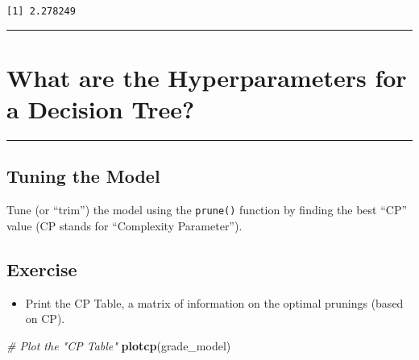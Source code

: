 \documentclass[
]{book}
\newenvironment{Shaded}{\begin{snugshade}}{\end{snugshade}}
\newcommand{\CommentTok}[1]{\textcolor[rgb]{0.56,0.35,0.01}{\textit{#1}}}
\newcommand{\DataTypeTok}[1]{\textcolor[rgb]{0.13,0.29,0.53}{#1}}
\newcommand{\KeywordTok}[1]{\textcolor[rgb]{0.13,0.29,0.53}{\textbf{#1}}}
\newcommand{\NormalTok}[1]{#1}
\newcommand{\OperatorTok}[1]{\textcolor[rgb]{0.81,0.36,0.00}{\textbf{#1}}}
\providecommand{\tightlist}{%
  \setlength{\itemsep}{0pt}\setlength{\parskip}{0pt}}
\begin{document}
\begin{Shaded}
\end{Shaded}

\begin{verbatim}
[1] 2.278249
\end{verbatim}

\begin{center}\rule{0.5\linewidth}{0.5pt}\end{center}

\hypertarget{what-are-the-hyperparameters-for-a-decision-tree}{%
\section{What are the Hyperparameters for a Decision Tree?}\label{what-are-the-hyperparameters-for-a-decision-tree}}

\begin{center}\rule{0.5\linewidth}{0.5pt}\end{center}

\hypertarget{tuning-the-model}{%
\subsection{Tuning the Model}\label{tuning-the-model}}

Tune (or ``trim'') the model using the \texttt{prune()} function by finding the best ``CP'' value (CP stands for ``Complexity Parameter'').

\hypertarget{exercise-7}{%
\subsection*{Exercise}\label{exercise-7}}

\begin{itemize}
\tightlist
\item
  Print the CP Table, a matrix of information on the optimal prunings (based on CP).
\end{itemize}

\begin{Shaded}
\begin{Highlighting}[]
\CommentTok{# Plot the "CP Table"}
\KeywordTok{plotcp}\NormalTok{(grade_model)}
\end{Highlighting}
\end{Shaded}
\end{document}
